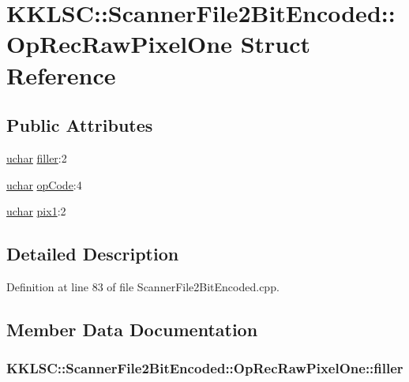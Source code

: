 \hypertarget{struct_scanner_file2_bit_encoded_1_1_op_rec_raw_pixel_one}{}\section{K\+K\+L\+SC\+:\+:Scanner\+File2\+Bit\+Encoded\+:\+:Op\+Rec\+Raw\+Pixel\+One Struct Reference}
\label{struct_scanner_file2_bit_encoded_1_1_op_rec_raw_pixel_one}
\subsection*{Public Attributes}
\begin{DoxyCompactItemize}
\item 
\hyperlink{namespace_k_k_b_ace9969169bf514f9ee6185186949cdf7}{uchar} \hyperlink{struct_scanner_file2_bit_encoded_1_1_op_rec_raw_pixel_one_a52aa06a5c150d354d080e5188fc380ee}{filler}\+:2
\item 
\hyperlink{namespace_k_k_b_ace9969169bf514f9ee6185186949cdf7}{uchar} \hyperlink{struct_scanner_file2_bit_encoded_1_1_op_rec_raw_pixel_one_a895ef08371f493809f1a1584318f1795}{op\+Code}\+:4
\item 
\hyperlink{namespace_k_k_b_ace9969169bf514f9ee6185186949cdf7}{uchar} \hyperlink{struct_scanner_file2_bit_encoded_1_1_op_rec_raw_pixel_one_a5d6b2e8bfea846b11d94b22fe7d0f0ee}{pix1}\+:2
\end{DoxyCompactItemize}


\subsection{Detailed Description}


Definition at line 83 of file Scanner\+File2\+Bit\+Encoded.\+cpp.



\subsection{Member Data Documentation}
\subsubsection[{\texorpdfstring{filler}{filler}}]{ K\+K\+L\+S\+C\+::\+Scanner\+File2\+Bit\+Encoded\+::\+Op\+Rec\+Raw\+Pixel\+One\+::filler}\hypertarget{struct_scanner_file2_bit_encoded_1_1_op_rec_raw_pixel_one_a52aa06a5c150d354d080e5188fc380ee}{}\label{struct_scanner_file2_bit_encoded_1_1_op_rec_raw_pixel_one_a52aa06a5c150d354d080e5188fc380ee}


